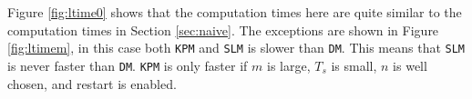 \noindent Figure \ref{fig:ltime0} shows that the computation times here are quite similar to the computation times in Section \ref{sec:naive}. The exceptions are shown in Figure \ref{fig:ltimem}, in this case both \texttt{KPM} and \texttt{SLM} is slower than \texttt{DM}. This means that \texttt{SLM} is never faster than \texttt{DM}. \texttt{KPM} is only faster if $m$ is large, $T_s$ is small, $n$ is well chosen, and restart is enabled.
